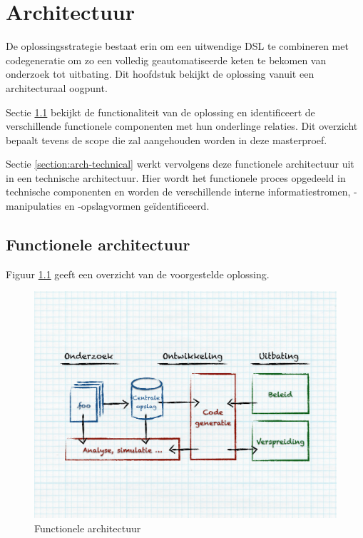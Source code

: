 
\chapter{Architectuur}
\label{chapter:architectuur}

De oplossingsstrategie bestaat erin om een uitwendige DSL te combineren met
codegeneratie om zo een volledig geautomatiseerde keten te bekomen van
onderzoek tot uitbating. Dit hoofdstuk bekijkt de oplossing vanuit een
architecturaal oogpunt.

Sectie \ref{section:arch-functional} bekijkt de functionaliteit van de
oplossing en identificeert de verschillende functionele componenten met hun
onderlinge relaties. Dit overzicht bepaalt tevens de scope die zal aangehouden
worden in deze masterproef.

Sectie \ref{section:arch-technical} werkt vervolgens deze functionele
architectuur uit in een technische architectuur. Hier wordt het functionele
proces opgedeeld in technische componenten en worden de verschillende interne
informatiestromen, -manipulaties en -opslagvormen ge\"identificeerd.

\section{Functionele architectuur}
\label{section:arch-functional}

Figuur \ref{fig:arch-functional} geeft een overzicht van de voorgestelde
oplossing.

\begin{figure}[ht]
  \centering
  \includegraphics[width=0.9\linewidth]{resources/arch-functional.pdf}
  \caption{Functionele architectuur}
  \label{fig:arch-functional}
\end{figure}

